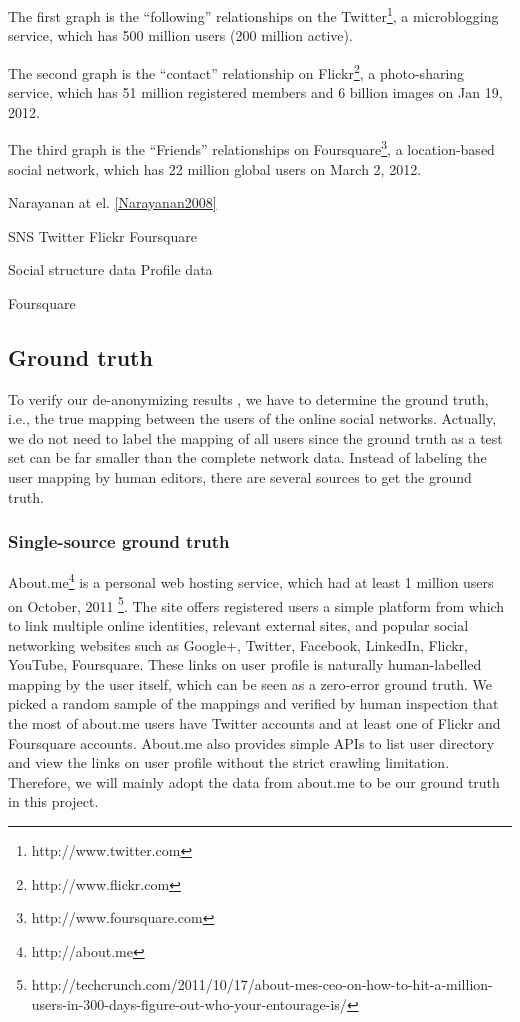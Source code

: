 \documentclass[11pt,letterpaper]{article}
\begin{document}
The first graph is the ``following'' relationships on the Twitter\footnote{http://www.twitter.com}, a microblogging service, which has 500 million users (200 million active). 

The second graph is the ``contact'' relationship on Flickr\footnote{http://www.flickr.com}, a photo-sharing service, which has 51 million registered members and 6 billion images on Jan 19, 2012.

The third graph is the ``Friends'' relationships on Foursquare\footnote{http://www.foursquare.com}, a location-based social network, which has 22 million global users on March 2, 2012. 



Narayanan at el. \ref{Narayanan2008} 

SNS 
Twitter
Flickr
Foursquare

Social structure data
Profile data

Foursquare 


\subsection{Ground truth}
To verify our de-anonymizing results , we have to determine the ground truth, i.e., the true mapping between the users of the online social networks. Actually, we do not need to label the mapping of all users since the ground truth as a test set can be far smaller than the complete network data.
Instead of labeling the user mapping by human editors, there are several sources to get the ground truth. 

\subsubsection{Single-source ground truth}

About.me\footnote{http://about.me} is a personal web hosting service, which had at least 1 million users on October, 2011 \footnote{http://techcrunch.com/2011/10/17/about-mes-ceo-on-how-to-hit-a-million-users-in-300-days-figure-out-who-your-entourage-is/}. The site offers registered users a simple platform from which to link multiple online identities, relevant external sites, and popular social networking websites such as Google+, Twitter, Facebook, LinkedIn, Flickr, YouTube, Foursquare. These links on user profile is naturally human-labelled mapping by the user itself, which can be seen as a zero-error ground truth.  We picked a random sample of the mappings and verified by human inspection that the most of about.me users have Twitter accounts and at least one of Flickr and Foursquare accounts. About.me also provides simple APIs to list user directory and view the links on user profile without the strict crawling limitation. Therefore, we will mainly adopt the data from about.me to be our ground truth in this project.
\end{document}
